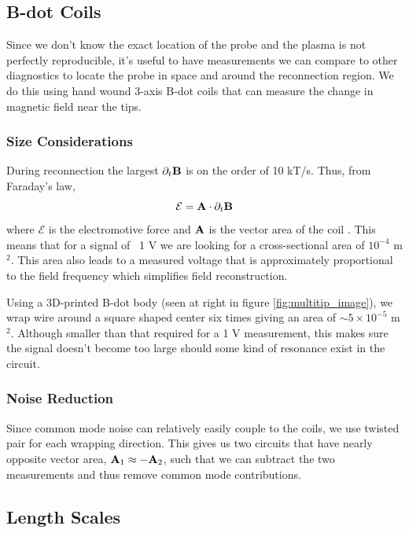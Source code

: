 \subsection{B-dot Coils}
\label{sss:multitip_bdot}

Since we don't know the exact location of the probe and the plasma is not perfectly reproducible, it's useful to have measurements we can compare to other diagnostics to locate the probe in space and around the reconnection region. We do this using hand wound 3-axis B-dot coils that can measure the change in magnetic field near the tips.

\subsubsection{Size Considerations}

During reconnection the largest $\partial_t \vb{B}$ is on the order of 10 kT/s. Thus, from Faraday's law,
\begin{equation}
    \mathcal{E} = \vb{A} \cdot \partial_t \vb{B}
\end{equation}
where $\mathcal{E}$ is the electromotive force and $\vb{A}$ is the vector area of the coil \cite{Jackson_1999}. %
This means that for a signal of ~1 V we are looking for a cross-sectional area of $10^{-4}$ m$^2$. This area also leads to a measured voltage that is approximately proportional to the field frequency which simplifies field reconstruction.

Using a 3D-printed B-dot body (seen at right in figure \ref{fig:multitip_image}), we wrap wire around a square shaped center six times giving an area of $\sim 5 \times 10^{-5}$ m$^2$. Although smaller than that required for a 1 V measurement, this makes sure the signal doesn't become too large should some kind of resonance exist in the circuit.

\subsubsection{Noise Reduction}

Since common mode noise can relatively easily couple to the coils, we use twisted pair for each wrapping direction. This gives us two circuits that have nearly opposite vector area, $\vb{A}_1 \approx -\vb{A}_2$, such that we can subtract the two measurements and thus remove common mode contributions.

\subsection{Length Scales}

